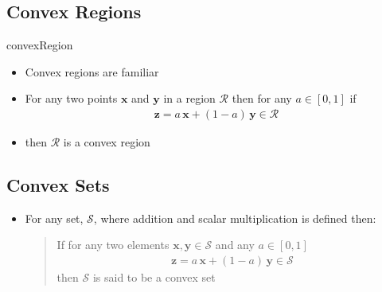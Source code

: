 \begin{slide}
\section{Convex Regions}

\begin{rightImage}[0.15]{convexRegion}
\begin{PauseHighLight}
  \begin{itemize}
  \item Convex regions are familiar\hfill{}\hfill\pause
  \item For any two points $\bm{x}$ and $\bm{y}$ in a region
    $\mathcal{R}$ then for any $a\in[0,1]$ if
    \begin{align*}
      \bm{z} = a\,\bm{x} + (1-a)\,\bm{y} \in \mathcal{R}
    \end{align*}
  \item then $\mathcal{R}$ is a convex region\pause
  \end{itemize}
\end{PauseHighLight}
\end{rightImage}

\end{slide}


\begin{slide}
\section{Convex Sets}

\begin{PauseHighLight}
  \begin{itemize}
  \item For any set, $\mathcal{S}$, where addition and scalar
    multiplication is defined then:
    \begin{quotation}
      \noindent If for any two elements $\bm{x},\bm{y} \in \mathcal{S}$ and any
      $a\in[0,1]$
      \begin{align*}
        \bm{z} = a\,\bm{x} + (1-a)\,\bm{y} \in \mathcal{S}
      \end{align*}
      then $\mathcal{S}$ is said to be a convex set\pause
    \end{quotation}
  \end{itemize}
\end{PauseHighLight}

\end{slide}


